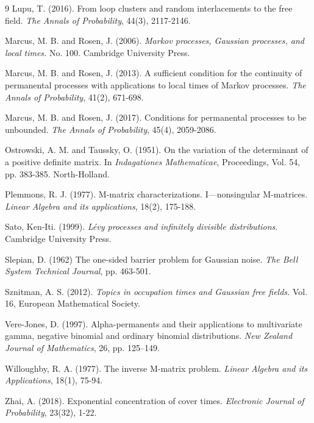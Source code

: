 \documentclass[a4paper, 11pt]{article}
\begin{document}
\begin{thebibliography}{9}
  Lupu, T. (2016). From loop clusters and random interlacements to the free field. {\em The Annals of Probability}, 44(3), 2117-2146.

  Marcus, M. B. and Rosen, J. (2006). {\em Markov processes, Gaussian processes, and local times.} No. 100. Cambridge University Press.

  Marcus, M. B. and Rosen, J. (2013). A sufficient condition for the continuity of permanental processes with applications to local times of Markov processes. {\em The Annals of Probability}, 41(2), 671-698.

  Marcus, M. B. and Rosen, J. (2017). Conditions for permanental processes to be unbounded. {\em The Annals of Probability}, 45(4), 2059-2086.

  Ostrowski, A. M. and Taussky, O. (1951). On the variation of the determinant of a positive definite matrix. In {\em Indagationes Mathematicae}, Proceedings, Vol. 54, pp. 383-385. North-Holland.

  Plemmons, R. J. (1977). M-matrix characterizations. I—nonsingular M-matrices. {\em Linear Algebra and its applications}, 18(2), 175-188.

  Sato, Ken-Iti. (1999). {\em Lévy processes and infinitely divisible distributions}. Cambridge University Press.

  Slepian, D. (1962) The one-sided barrier problem for Gaussian noise. {\em The Bell System Technical Journal}, pp. 463-501.

  Sznitman, A. S. (2012). {\em Topics in occupation times and Gaussian free fields.} Vol. 16, European Mathematical Society.

  Vere-Jones, D. (1997). Alpha-permanents and their applications to multivariate gamma, negative
binomial and ordinary binomial distributions. {\em New Zealand Journal of Mathematics}, 26, pp. 125–149.

  Willoughby, R. A. (1977). The inverse M-matrix problem. {\em Linear Algebra and its Applications}, 18(1), 75-94.

  Zhai, A. (2018). Exponential concentration of cover times. {\em Electronic Journal of Probability}, 23(32), 1-22.

\end{thebibliography}
\end{document}
